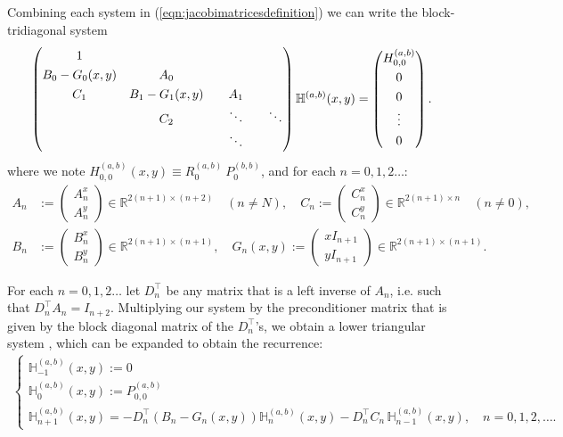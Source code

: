 \documentclass[11pt, oneside]{article}   	%
\newcommand{\R}{\mathbb{R}}
\newcommand{\hdop}{H}
\newcommand{\bighdop}{\mathbb{\hdop}}
\newcommand{\hdopab}{\hdop^{(a,b)}}
\newcommand{\bighdopab}{\bighdop^{(a,b)}}
\newcommand{\Dnt}{D^\top_n}
\newcommand{\genjac}{R}
\begin{document}
Combining each system in (\ref{eqn:jacobimatricesdefinition}) we can write the block-tridiagonal system
\begin{align*}
\renewcommand\arraystretch{1.3}
\begin{pmatrix}
		1 & & & \\
		B_0-G_0(x,y) & A_0 & & \\
		C_1 & B_1-G_1(x,y) & \quad A_1 \quad & \\
		& C_2 & \ddots & \ddots \\
		& & \ddots &
\end{pmatrix}
\bighdopab(x,y)
=
\begin{pmatrix}
	\hdopab_{0,0} \\ 0 \\ 0 \\ \vdots \\ 0 \\
\end{pmatrix}.
\end{align*}
where we note $\hdopab_{0,0}(x,y) \equiv \genjac_0^{(a,b)} \: P_0^{(b,b)}$, and for each $n = 0,1,2\dots$:
\begin{align*}
A_n &:= \begin{pmatrix}
		A^x_n \\
		A^y_n
	    \end{pmatrix} \in \R^{2(n+1)\times(n+2)} \quad (n \ne N), \quad
C_n := \begin{pmatrix}
		C^x_n \\
		C^y_n
	    \end{pmatrix} \in \R^{2(n+1)\times n} \quad (n \ne 0), \nonumber \\
B_n &:= \begin{pmatrix}
		B^x_n \\
		B^y_n
	    \end{pmatrix} \in \R^{2(n+1)\times(n+1)}, \quad
G_n(x,y) := \begin{pmatrix}
		xI_{n+1} \\
		yI_{n+1}
	    \end{pmatrix} \in \R^{2(n+1)\times(n+1)}.
\end{align*}
 
For each $n = 0,1,2\dots$ let $\Dnt$ be any matrix that is a left inverse of $A_n$, i.e. such that $\Dnt A_n = I_{n+2}$. Multiplying our system by the preconditioner matrix that is given by the block diagonal matrix of the $\Dnt$'s, we obtain a lower triangular system \cite[p78]{dunkl2014orthogonal}, which can be expanded to obtain the recurrence:
\begin{align*}
\begin{cases}
\bighdopab_{-1}(x,y) := 0 \\
\bighdopab_{0}(x,y) := P^{(a,b)}_{0,0} \\
\bighdopab_{n+1}(x,y) = -\Dnt (B_n-G_n(x,y)) \bighdopab_n(x,y) - \Dnt C_n  \,\bighdopab_{n-1}(x,y), \quad n = 0,1,2,\dots.
\end{cases}
\end{align*}
\end{document}
